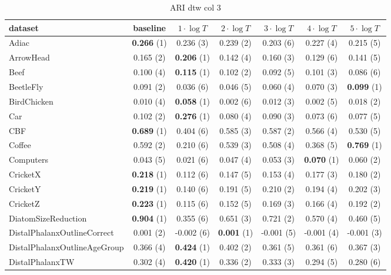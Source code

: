     \begin{table}[ht]
    \caption{ARI dtw col 3} 
    \begin{adjustbox}{width=\textwidth}
    \begin{tabular}{lcccccc}
    \hline
    dataset & baseline & \textbf{$1\cdot \log{T}$} & \textbf{$2\cdot \log{T}$} & \textbf{$3\cdot \log{T}$} & \textbf{$4\cdot \log{T}$} & \textbf{$5\cdot \log{T}$} \\ \hline
    Adiac & \textbf{0.266} (1) & 0.236 (3) & 0.239 (2) & 0.203 (6) & 0.227 (4) & 0.215 (5) \\
    ArrowHead & 0.165 (2) & \textbf{0.206} (1) & 0.142 (4) & 0.160 (3) & 0.129 (6) & 0.141 (5) \\
    Beef & 0.100 (4) & \textbf{0.115} (1) & 0.102 (2) & 0.092 (5) & 0.101 (3) & 0.086 (6) \\
    BeetleFly & 0.091 (2) & 0.036 (6) & 0.046 (5) & 0.060 (4) & 0.070 (3) & \textbf{0.099} (1) \\
    BirdChicken & 0.010 (4) & \textbf{0.058} (1) & 0.002 (6) & 0.012 (3) & 0.002 (5) & 0.018 (2) \\
    Car & 0.102 (2) & \textbf{0.276} (1) & 0.080 (4) & 0.090 (3) & 0.073 (6) & 0.077 (5) \\
    CBF & \textbf{0.689} (1) & 0.404 (6) & 0.585 (3) & 0.587 (2) & 0.566 (4) & 0.530 (5) \\
    Coffee & 0.592 (2) & 0.210 (6) & 0.539 (3) & 0.508 (4) & 0.368 (5) & \textbf{0.769} (1) \\
    Computers & 0.043 (5) & 0.021 (6) & 0.047 (4) & 0.053 (3) & \textbf{0.070} (1) & 0.060 (2) \\
    CricketX & \textbf{0.218} (1) & 0.112 (6) & 0.147 (5) & 0.153 (4) & 0.177 (3) & 0.180 (2) \\
    CricketY & \textbf{0.219} (1) & 0.140 (6) & 0.191 (5) & 0.210 (2) & 0.194 (4) & 0.202 (3) \\
    CricketZ & \textbf{0.223} (1) & 0.115 (6) & 0.152 (5) & 0.169 (3) & 0.166 (4) & 0.192 (2) \\
    DiatomSizeReduction & \textbf{0.904} (1) & 0.355 (6) & 0.651 (3) & 0.721 (2) & 0.570 (4) & 0.460 (5) \\
    DistalPhalanxOutlineCorrect & 0.001 (2) & -0.002 (6) & \textbf{0.001} (1) & -0.001 (5) & -0.001 (4) & -0.001 (3) \\
    DistalPhalanxOutlineAgeGroup & 0.366 (4) & \textbf{0.424} (1) & 0.402 (2) & 0.361 (5) & 0.361 (6) & 0.367 (3) \\
    DistalPhalanxTW & 0.302 (4) & \textbf{0.420} (1) & 0.336 (2) & 0.333 (3) & 0.294 (5) & 0.280 (6) \\

\end{tabular}
\end{adjustbox}
\end{table}

